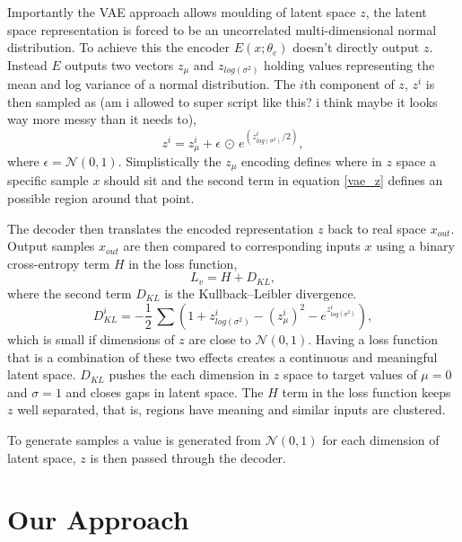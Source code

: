 \documentclass{article}
\begin{document}
        Importantly the VAE approach allows moulding of latent space $z$, the latent space representation is forced to be an uncorrelated multi-dimensional normal distribution. To achieve this the encoder $E(x;\theta_e)$ doesn't directly output $z$. Instead $E$ outputs two vectors $z_{\mu}$ and $z_{log(\sigma^2)}$ holding values representing the mean and log variance of a normal distribution. The $i$th component of $z$, $z^i$ is then sampled as (am i allowed to super script like this? i think maybe it looks way more messy than it needs to),
        \begin{equation}\label{vae_z}
            z^i = z_{\mu}^i + \epsilon\,\odot\,e^{(z_{log(\sigma^2)}^i / 2)},
        \end{equation}
        where $\epsilon = \mathcal{N} (0, 1)$. Simplistically the $z_{\mu}$ encoding defines where in $z$ space a specific sample $x$ should sit and the second term in equation \ref{vae_z} defines an possible region around that point. 
        
        The decoder then translates the encoded representation $z$ back to real space $x_{out}$. Output samples $x_{out}$ are then compared to corresponding inputs $x$ using a binary cross-entropy term $H$ in the loss function,
        \begin{equation}\label{vae_loss}
            L_v = H + D_{KL},
        \end{equation}
        where the second term $D_{KL}$ is the Kullback–Leibler divergence. 
        \begin{equation}\label{vae_kl}
            D_{KL}^i = -\frac{1}{2}\,\sum (1 + z_{log(\sigma^2)}^i - (z_{\mu}^i)^2 - e^{z_{log(\sigma^2)}^i}),
        \end{equation}
        which is small if dimensions of $z$ are close to $\mathcal{N} (0, 1)$. Having a loss function that is a combination of these two effects creates a continuous and meaningful latent space. $D_{KL}$ pushes the each dimension in $z$ space to target values of $\mu = 0$ and $\sigma = 1$ and closes gaps in latent space. The $H$ term in the loss function keeps $z$ well separated, that is, regions have meaning and similar inputs are clustered.
        
        To generate samples a value is generated from $\mathcal{N} (0, 1)$ for each dimension of latent space, $z$ is then passed through the decoder.
        
    
\section{Our Approach}   
\end{document}
